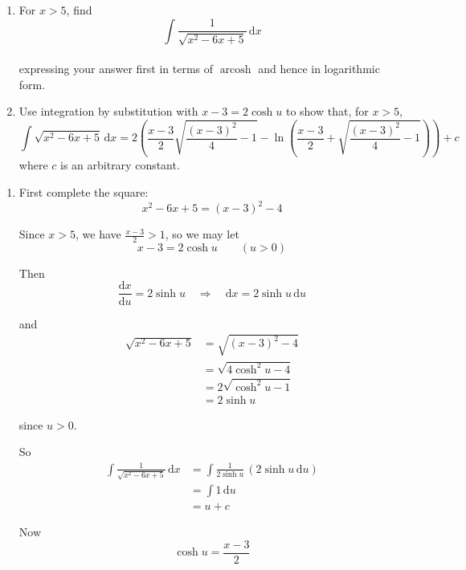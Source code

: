 \documentclass[leqno]{article}
\begin{document}
\begin{enumerate}[
  label=\textbf{\arabic*.},
  leftmargin=*,
  topsep=0pt,
  partopsep=0pt,
  parsep=0pt
]
\newpage

\questionitem

\begin{enumerate}[label=(\roman*), start=1]
  \item For $x>5$, find
  \[
  \int \frac{1}{\sqrt{x^2-6x+5}}\,\mathrm{d}x
  \] \\
  expressing your answer first in terms of $\operatorname{arcosh}$ and hence in logarithmic form.  \\
  \item Use integration by substitution with $x-3=2\cosh u$ to show that, for $x>5$,
  \[
  \int \sqrt{x^2-6x+5}\,\mathrm{d}x=2\left(\frac{x-3}{2}\sqrt{\frac{(x-3)^2}{4}-1}-\ln\left(\frac{x-3}{2}+\sqrt{\frac{(x-3)^2}{4}-1}\right)\right)+c
  \]
  where $c$ is an arbitrary constant.  \\
\end{enumerate}

\vspace*{10pt}

\begin{djsSolution}
\begin{enumerate}[label=\textbf{(\roman*)}, start=1]
  \item First complete the square:
  \[
  x^2-6x+5=(x-3)^2-4
  \]

  Since $x>5$, we have $\frac{x-3}{2}>1$, so we may let
  \[
  x-3=2\cosh u \qquad (u>0)
  \]

  Then
  \[
  \frac{\mathrm{d}x}{\mathrm{d}u}=2\sinh u
  \quad\Longrightarrow\quad
  \mathrm{d}x=2\sinh u\,\mathrm{d}u
  \]

  and
  \begin{align*}
  \sqrt{x^2-6x+5}
  &=\sqrt{(x-3)^2-4} \\
  &=\sqrt{4\cosh^2u-4} \\
  &=2\sqrt{\cosh^2u-1} \\
  &=2\sinh u
  \end{align*}

  since $u>0$.

  So
  \begin{align*}
  \int \frac{1}{\sqrt{x^2-6x+5}}\,\mathrm{d}x
  &=\int \frac{1}{2\sinh u}\,(2\sinh u\,\mathrm{d}u) \\
  &=\int 1\,\mathrm{d}u \\
  &=u+c
  \end{align*}

  Now
  \[
  \cosh u=\frac{x-3}{2}
  \]


\end{enumerate}
\end{djsSolution}
\end{enumerate}
\end{document}
